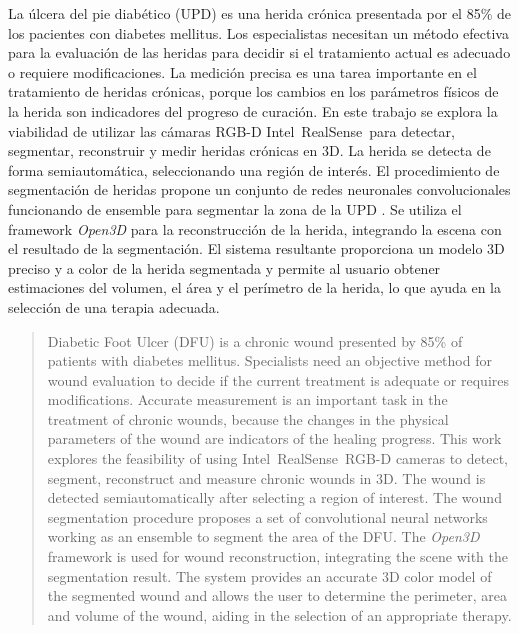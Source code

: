 \begin{resumen}
	La úlcera del pie diabético (UPD) es una herida crónica presentada por el 85\% de los pacientes con diabetes mellitus. Los especialistas necesitan un método efectiva para la evaluación de las heridas para decidir si el tratamiento actual es adecuado o requiere modificaciones. La medición precisa es una tarea importante en el tratamiento de heridas crónicas, porque los cambios en los parámetros físicos de la herida son indicadores del progreso de curación. En este trabajo se explora la viabilidad de utilizar las cámaras RGB-D Intel\textregistered~RealSense\texttrademark~para detectar, segmentar, reconstruir y medir heridas crónicas en 3D. La herida se detecta de forma semiautomática, seleccionando una región de interés. El procedimiento de segmentación de heridas  propone un conjunto de redes neuronales convolucionales funcionando de ensemble para segmentar la zona de la UPD . Se utiliza el framework \textit{Open3D} para la reconstrucción de la herida, integrando la escena con el resultado de la segmentación. El sistema resultante proporciona un modelo 3D preciso y a color de la herida segmentada y permite al usuario obtener estimaciones del volumen, el área y el perímetro de la herida, lo que ayuda en la selección de una terapia adecuada.
\end{resumen}

\begin{abstract}
Diabetic Foot Ulcer (DFU) is a chronic wound presented by 85\% of patients with diabetes mellitus. Specialists need an objective method for wound evaluation to decide if the current treatment is adequate or requires modifications. Accurate measurement is an important task in the treatment of chronic wounds, because the changes in the physical parameters of the wound are indicators of the healing progress. This work explores the feasibility of using Intel\textregistered~RealSense\texttrademark~RGB-D cameras to detect, segment, reconstruct and measure chronic wounds in 3D. The wound is detected semiautomatically after selecting a region of interest. The wound segmentation procedure proposes a set of convolutional neural networks working as an ensemble to segment the area of   the DFU. The \textit{Open3D} framework is used for wound reconstruction, integrating the scene with the segmentation result. The system provides an accurate 3D color model of the segmented wound and allows the user to determine the perimeter, area and volume of the wound, aiding in the selection of an appropriate therapy.
\end{abstract}